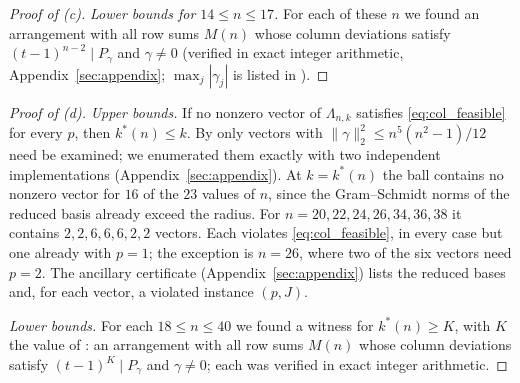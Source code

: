 \begin{proof}[Proof of (c)]
\emph{Lower bounds for $14\le n\le17$.}  For each of these $n$ we found an arrangement with all row sums $M(n)$ whose column deviations satisfy $(t-1)^{n-2}\mid P_\gamma$ and $\gamma\ne0$ (verified in exact integer arithmetic, Appendix~\ref{sec:appendix}; $\max_j|\gamma_j|$ is listed in ).
\end{proof}

\begin{proof}[Proof of (d)]
\emph{Upper bounds.}  If no nonzero vector of $\Lambda_{n,k}$ satisfies \eqref{eq:col_feasible} for every $p$, then $k^*(n)\le k$.
By  only vectors with $\|\gamma\|_2^2\le n^5(n^2-1)/12$ need be examined; we enumerated them exactly with two independent implementations (Appendix~\ref{sec:appendix}).
At $k=k^*(n)$ the ball contains no nonzero vector for $16$ of the $23$ values of $n$, since the Gram--Schmidt norms of the reduced basis already exceed the radius.
For $n=20,22,24,26,34,36,38$ it contains $2,2,6,6,6,2,2$ vectors.
Each violates \eqref{eq:col_feasible}, in every case but one already with $p=1$; the exception is $n=26$, where two of the six vectors need $p=2$.
The ancillary certificate (Appendix~\ref{sec:appendix}) lists the reduced bases and, for each vector, a violated instance $(p,J)$.

\emph{Lower bounds.}  For each $18\le n\le40$ we found a witness for $k^*(n)\ge K$, with $K$ the value of : an arrangement with all row sums $M(n)$ whose column deviations satisfy $(t-1)^{K}\mid P_\gamma$ and $\gamma\ne0$; each was verified in exact integer arithmetic.
\end{proof}

